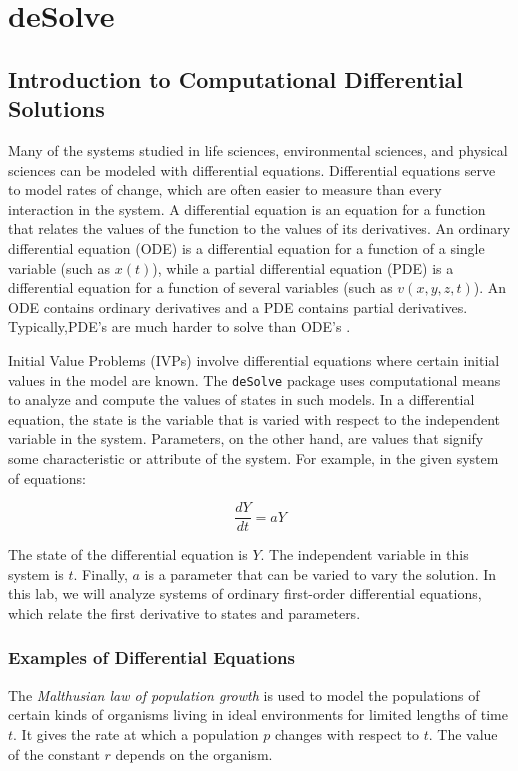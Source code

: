 \chapter{deSolve}
\section{Introduction to Computational Differential Solutions}

Many of the systems studied in life sciences, environmental sciences, and physical sciences can be modeled with differential equations.
Differential equations serve to model rates of change, which are often easier to measure than every interaction in the system.
A differential equation is an equation for a function that relates the values of the function to the values of its derivatives.
An ordinary differential equation (ODE) is a differential equation for a function of a single variable (such as $x(t)$), while a partial differential equation (PDE) is a differential equation for a function of several variables (such as $v(x,y,z,t)$).
An ODE contains ordinary derivatives and a PDE contains partial derivatives. Typically,PDE's are much harder to solve than ODE's \cite{chasnov}.

Initial Value Problems (IVPs) involve differential equations where certain initial values in the model are known.
The \texttt{deSolve} package uses computational means to analyze and compute the values of states in such models.
In a differential equation, the state is the variable that is varied with respect to the independent variable in the system.
Parameters, on the other hand, are values that signify some characteristic or attribute of the system.
For example, in the given system of equations:

\begin{equation*}
    \frac{dY}{dt}=aY
\end{equation*}

The state of the differential equation is $Y$.
The independent variable in this system is $t$.
Finally, $a$ is a parameter that can be varied to vary the solution.
In this lab, we will analyze systems of ordinary first-order differential equations, which relate the first derivative to states and parameters.

\subsection{Examples of Differential Equations}

The \textit{Malthusian law of population growth} is used to model the populations of certain kinds of organisms living in ideal environments for limited lengths of time $t$.
It gives the rate at which a population $p$ changes with respect to $t$.
The value of the constant $r$ depends on the organism.

